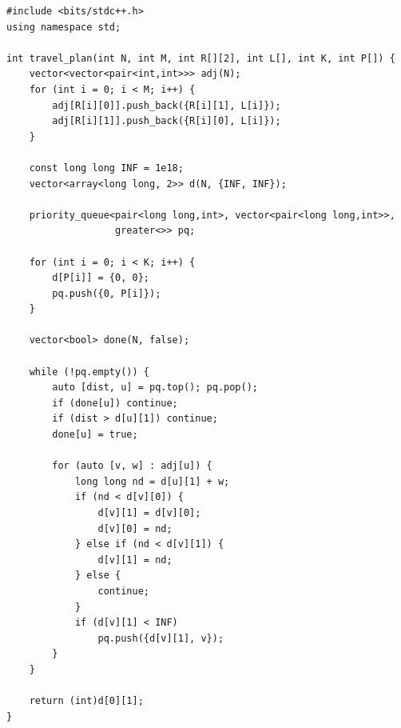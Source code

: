 \documentclass[11pt,a4paper]{article}
\begin{document}
\begin{lstlisting}
#include <bits/stdc++.h>
using namespace std;

int travel_plan(int N, int M, int R[][2], int L[], int K, int P[]) {
    vector<vector<pair<int,int>>> adj(N);
    for (int i = 0; i < M; i++) {
        adj[R[i][0]].push_back({R[i][1], L[i]});
        adj[R[i][1]].push_back({R[i][0], L[i]});
    }

    const long long INF = 1e18;
    vector<array<long long, 2>> d(N, {INF, INF});

    priority_queue<pair<long long,int>, vector<pair<long long,int>>,
                   greater<>> pq;

    for (int i = 0; i < K; i++) {
        d[P[i]] = {0, 0};
        pq.push({0, P[i]});
    }

    vector<bool> done(N, false);

    while (!pq.empty()) {
        auto [dist, u] = pq.top(); pq.pop();
        if (done[u]) continue;
        if (dist > d[u][1]) continue;
        done[u] = true;

        for (auto [v, w] : adj[u]) {
            long long nd = d[u][1] + w;
            if (nd < d[v][0]) {
                d[v][1] = d[v][0];
                d[v][0] = nd;
            } else if (nd < d[v][1]) {
                d[v][1] = nd;
            } else {
                continue;
            }
            if (d[v][1] < INF)
                pq.push({d[v][1], v});
        }
    }

    return (int)d[0][1];
}
\end{lstlisting}
\end{document}
